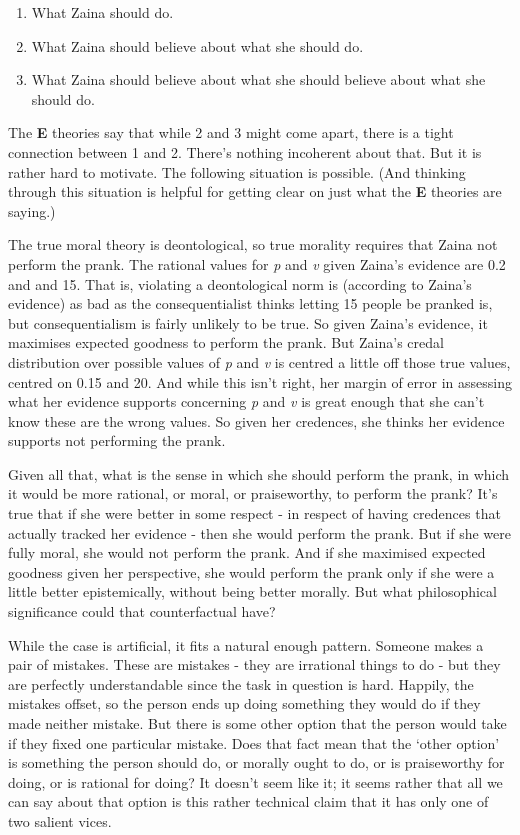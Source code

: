 \documentclass[
  10pt,
  letterpaper,
  twoside]{scrbook}
\providecommand{\tightlist}{%
  \setlength{\itemsep}{0pt}\setlength{\parskip}{0pt}}\usepackage{longtable,booktabs,array}
\begin{document}
\begin{enumerate}
\def\labelenumi{\arabic{enumi}.}
\tightlist
\item
  What {Zaina} should do.
\item
  What {Zaina} should believe about what she should do.
\item
  What {Zaina} should believe about what she should believe about what
  she should do.
\end{enumerate}

The \textbf{E} theories say that while 2 and 3 might come apart, there
is a tight connection between 1 and 2. There's nothing incoherent about
that. But it is rather hard to motivate. The following situation is
possible. (And thinking through this situation is helpful for getting
clear on just what the \textbf{E} theories are saying.)

The true moral theory is deontological, so true morality requires that
{Zaina} not perform the prank. The rational values for \emph{p} and
\emph{v} given {Zaina}'s evidence are 0.2 and and 15. That is, violating
a deontological norm is (according to Zaina's evidence) as bad as the
consequentialist thinks letting 15 people be pranked is, but
consequentialism is fairly unlikely to be true. So given {Zaina}'s
evidence, it maximises expected goodness to perform the prank. But
{Zaina}'s credal distribution over possible values of \emph{p} and
\emph{v} is centred a little off those true values, centred on 0.15 and
20. And while this isn't right, her margin of error in assessing what
her evidence supports concerning \emph{p} and \emph{v} is great enough
that she can't know these are the wrong values. So given her credences,
she thinks her evidence supports not performing the prank.

Given all that, what is the sense in which she should perform the prank,
in which it would be more rational, or moral, or praiseworthy, to
perform the prank? It's true that if she were better in some respect -
in respect of having credences that actually tracked her evidence - then
she would perform the prank. But if she were fully moral, she would not
perform the prank. And if she maximised expected goodness given her
perspective, she would perform the prank only if she were a little
better epistemically, without being better morally. But what
philosophical significance could that counterfactual have?

While the case is artificial, it fits a natural enough pattern. Someone
makes a pair of mistakes. These are mistakes - they are irrational
things to do - but they are perfectly understandable since the task in
question is hard. Happily, the mistakes offset, so the person ends up
doing something they would do if they made neither mistake. But there is
some other option that the person would take if they fixed one
particular mistake. Does that fact mean that the `other option' is
something the person should do, or morally ought to do, or is
praiseworthy for doing, or is rational for doing? It doesn't seem like
it; it seems rather that all we can say about that option is this rather
technical claim that it has only one of two salient vices.
\end{document}
